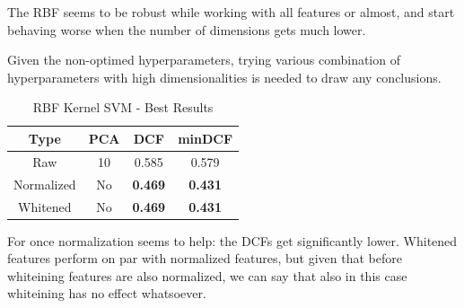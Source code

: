 \documentclass[twocolumn]{article}
\begin{document}
The RBF seems to be robust while working with all features or almost, and start behaving worse when the number of dimensions gets much lower.

Given the non-optimed hyperparameters, trying various combination of hyperparameters with high dimensionalities is needed to draw any conclusions.

\begin{table}[H]
    \centering
        \begin{tabular}{||c|c|c|c||}
            \hline
            Type & PCA & DCF & minDCF \\
            \hline
            \hline
                Raw & 10 & 0.585 &  0.579 \\ 
                Normalized & No &  {\bf 0.469}  &  {\bf 0.431} \\
                Whitened & No &  {\bf 0.469}  &  {\bf 0.431} \\
            \hline
    \end{tabular}
    \caption{RBF Kernel SVM - Best Results}
\end{table}

For once normalization seems to help: the DCFs get significantly lower. 
Whitened features perform on par with normalized features, but given that before whiteining features are also normalized, we can say that also in this case whiteining has no effect whatsoever.


\newpage
\begin{table}



\end{table}

\newpage
\begin{table}



\end{table}
\end{document}

